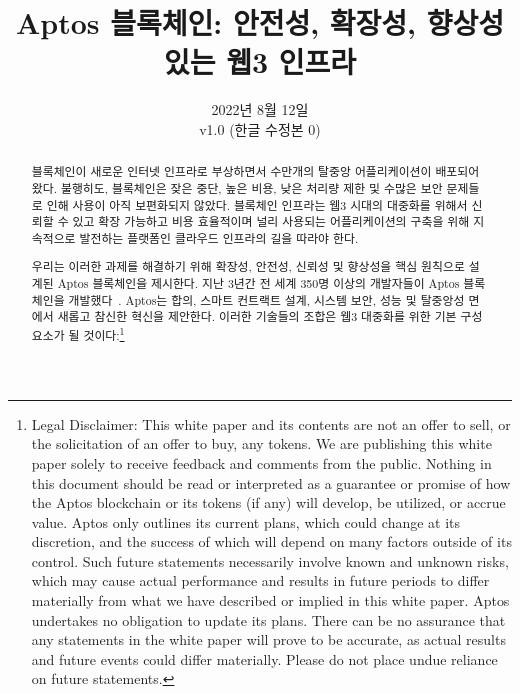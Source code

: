 \documentclass{article}
\title{Aptos 블록체인: 안전성, 확장성, 향상성 있는 웹3 인프라}
\author{}
\date{2022년 8월 12일\\v1.0 (한글 수정본 0)}
\begin{document}
\maketitle

\renewcommand{\abstractname}{초록}
\renewcommand{\figurename}{그림}

\begin{abstract}
블록체인이 새로운 인터넷 인프라로 부상하면서 수만개의 탈중앙 어플리케이션이 배포되어 왔다. 불행히도, 블록체인은 잦은 중단, 높은 비용, 낮은 처리량 제한 및 수많은 보안 문제들로 인해 사용이 아직 보편화되지 않았다. 블록체인 인프라는 웹3 시대의 대중화를 위해서 신뢰할 수 있고 확장 가능하고 비용 효율적이며 널리 사용되는 어플리케이션의 구축을 위해 지속적으로 발전하는 플랫폼인 클라우드 인프라의 길을 따라야 한다.

우리는 이러한 과제를 해결하기 위해 확장성, 안전성, 신뢰성 및 향상성을 핵심 원칙으로 설계된  Aptos 블록체인을 제시한다. 지난 3년간 전 세계 350명 이상의 개발자들이 Aptos 블록체인을 개발했다~\cite{aptos_core_github}. Aptos는 합의, 스마트 컨트랙트 설계, 시스템 보안, 성능 및 탈중앙성 면에서 새롭고 참신한 혁신을 제안한다. 이러한 기술들의 조합은 웹3 대중화를 위한 기본 구성 요소가 될 것이다:\footnote{Legal Disclaimer: This white paper and its contents are not an offer to sell, or the solicitation of an offer to buy, any tokens. We are publishing this white paper solely to receive feedback and comments from the public. Nothing in this document should be read or interpreted as a guarantee or promise of how the Aptos blockchain or its tokens (if any) will develop, be utilized, or accrue value. Aptos only outlines its current plans, which could change at its discretion, and the success of which will depend on many factors outside of its control. Such future statements necessarily involve known and unknown risks, which may cause actual performance and results in future periods to differ materially from what we have described or implied in this white paper. Aptos undertakes no obligation to update its plans. There can be no assurance that any statements in the white paper will prove to be accurate, as actual results and future events could differ materially. Please do not place undue reliance on future statements.}
 

\end{abstract}
\end{document}
